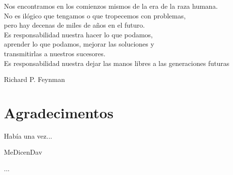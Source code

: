 %
%
%
%
%
%




\thispagestyle{plain}

\vspace*{0.4\textwidth}

\begin{FraseCelebreCentrada}
  \begin{FraseCentrada}
    Nos encontramos en los comienzos mismos de la era de la raza humana.\\
    No es ilógico que tengamos o que tropecemos con problemas, \\
    pero hay decenas de miles de años en el futuro. \\
    Es responsabilidad nuestra hacer lo que podamos, \\
    aprender lo que podamos, mejorar las soluciones y \\
    transmitirlas a nuestros sucesores. \\
    Es responsabilidad nuestra dejar las manos libres a las generaciones futuras
  \end{FraseCentrada}
  \begin{FuenteCentrada}
    Richard P. Feynman
  \end{FuenteCentrada}
\end{FraseCelebreCentrada}

\newpage



\thispagestyle{plain}
\chapter*{Agradecimentos}
\begin{FraseCelebre}
  \begin{Frase}
    Había una vez...
  \end{Frase}
  \begin{Fuente}
    MeDicenDav
  \end{Fuente}
\end{FraseCelebre}


...


\cleardoublepage
\restauraCabecera